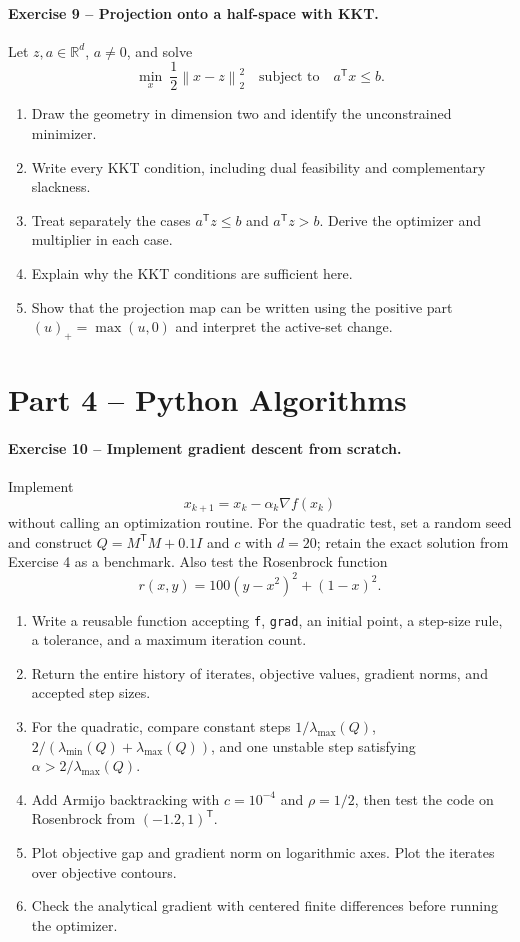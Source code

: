 \documentclass[10pt]{article}
\newcommand{\R}{\mathbb{R}}
\newcommand{\trans}{^{\mathsf T}}
\newcommand{\norm}[1]{\left\lVert#1\right\rVert}
\begin{document}
\paragraph{Exercise 9 -- Projection onto a half-space with KKT.}
Let $z,a\in\R^d$, $a\neq0$, and solve
\[
\min_x\ \frac12\norm{x-z}_2^2
\quad\text{subject to}\quad a\trans x\leq b.
\]
\begin{enumerate}
\item Draw the geometry in dimension two and identify the unconstrained
minimizer.
\item Write every KKT condition, including dual feasibility and
complementary slackness.
\item Treat separately the cases $a\trans z\leq b$ and $a\trans z>b$.
Derive the optimizer and multiplier in each case.
\item Explain why the KKT conditions are sufficient here.
\item Show that the projection map can be written using the positive part
$(u)_+=\max(u,0)$ and interpret the active-set change.
\end{enumerate}

\section{Part 4 -- Python Algorithms}

\paragraph{Exercise 10 -- Implement gradient descent from scratch.}
Implement
\[
x_{k+1}=x_k-\alpha_k\nabla f(x_k)
\]
without calling an optimization routine. For the quadratic test, set a random
seed and construct $Q=M\trans M+0.1I$ and $c$ with $d=20$; retain the exact
solution from Exercise 4 as a benchmark. Also test the Rosenbrock function
\[
r(x,y)=100(y-x^2)^2+(1-x)^2.
\]
\begin{enumerate}
\item Write a reusable function accepting \texttt{f}, \texttt{grad}, an
initial point, a step-size rule, a tolerance, and a maximum iteration count.
\item Return the entire history of iterates, objective values, gradient
norms, and accepted step sizes.
\item For the quadratic, compare constant steps $1/\lambda_{\max}(Q)$,
$2/(\lambda_{\min}(Q)+\lambda_{\max}(Q))$, and one unstable step satisfying
$\alpha>2/\lambda_{\max}(Q)$.
\item Add Armijo backtracking with $c=10^{-4}$ and $\rho=1/2$, then test the
code on Rosenbrock from $(-1.2,1)\trans$.
\item Plot objective gap and gradient norm on logarithmic axes. Plot the
iterates over objective contours.
\item Check the analytical gradient with centered finite differences before
running the optimizer.
\end{enumerate}
\end{document}
